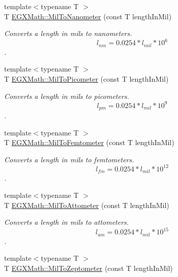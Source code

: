\begin{DoxyCompactItemize}
{\footnotesize template$<$typename T $>$ }\\T \mbox{\hyperlink{group___e_g_x_math-_conversions-_length_conversions-_imperial-_mil-_s_i_gaf5c65c9790e4478084a2dbbc62e15d93}{E\+G\+X\+Math\+::\+Mil\+To\+Nanometer}} (const T length\+In\+Mil)
\begin{DoxyCompactList}\small\item\em Converts a length in mils to nanometers. \[ l_{nm}=0.0254* l_{mil} * 10^{6} \]. \end{DoxyCompactList}\item 
{\footnotesize template$<$typename T $>$ }\\T \mbox{\hyperlink{group___e_g_x_math-_conversions-_length_conversions-_imperial-_mil-_s_i_ga29a85f8ec2e5cf4d963468f882de8447}{E\+G\+X\+Math\+::\+Mil\+To\+Picometer}} (const T length\+In\+Mil)
\begin{DoxyCompactList}\small\item\em Converts a length in mils to picometers. \[ l_{pm}=0.0254* l_{mil} * 10^{9} \]. \end{DoxyCompactList}\item 
{\footnotesize template$<$typename T $>$ }\\T \mbox{\hyperlink{group___e_g_x_math-_conversions-_length_conversions-_imperial-_mil-_s_i_gae66c2e7eb61fb3348c0b95a70088fff9}{E\+G\+X\+Math\+::\+Mil\+To\+Femtometer}} (const T length\+In\+Mil)
\begin{DoxyCompactList}\small\item\em Converts a length in mils to femtometers. \[ l_{fm}=0.0254* l_{mil} * 10^{12} \]. \end{DoxyCompactList}\item 
{\footnotesize template$<$typename T $>$ }\\T \mbox{\hyperlink{group___e_g_x_math-_conversions-_length_conversions-_imperial-_mil-_s_i_ga73766988fce0feea206c432f3237e5c6}{E\+G\+X\+Math\+::\+Mil\+To\+Attometer}} (const T length\+In\+Mil)
\begin{DoxyCompactList}\small\item\em Converts a length in mils to attometers. \[ l_{am}=0.0254* l_{mil} * 10^{15} \]. \end{DoxyCompactList}\item 
{\footnotesize template$<$typename T $>$ }\\T \mbox{\hyperlink{group___e_g_x_math-_conversions-_length_conversions-_imperial-_mil-_s_i_ga2f5d6fae48c67d44f71200ac8189246f}{E\+G\+X\+Math\+::\+Mil\+To\+Zeptometer}} (const T length\+In\+Mil)

\end{DoxyCompactItemize}
